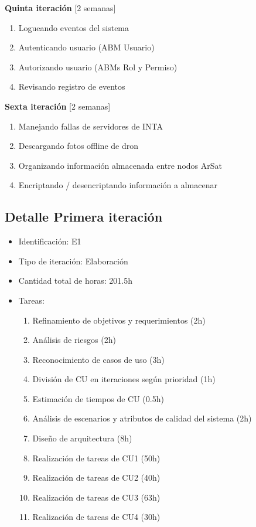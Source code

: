 \textbf{Quinta iteración} [2 semanas]
	\begin{enumerate} \itemsep -2pt
		\item Logueando eventos del sistema
		\item Autenticando usuario (ABM Usuario)
		\item Autorizando usuario (ABMs Rol y Permiso)
		\item Revisando registro de eventos
	\end{enumerate}

\textbf{Sexta iteración} [2 semanas]
	\begin{enumerate} \itemsep -2pt
		\item Manejando fallas de servidores de INTA
		\item Descargando fotos offline de dron
		\item Organizando información almacenada entre nodos ArSat
		\item Encriptando / desencriptando información a almacenar
	\end{enumerate}

\subsection{Detalle Primera iteración}

\begin{itemize}
\item Identificación: E1
\item Tipo de iteración: Elaboración
\item Cantidad total de horas: 201.5h
\item Tareas:
	\begin{enumerate}
	\item Refinamiento de objetivos y requerimientos (2h)
	\item Análisis de riesgos (2h)
	\item Reconocimiento de casos de uso (3h)
	\item División de CU en iteraciones según prioridad (1h)
	\item Estimación de tiempos de CU (0.5h)
	\item Análisis de escenarios y atributos de calidad del sistema (2h)
	\item Diseño de arquitectura (8h)
	\item Realización de tareas de CU1 (50h)
	\item Realización de tareas de CU2 (40h)
	\item Realización de tareas de CU3 (63h)
	\item Realización de tareas de CU4 (30h)
	\end{enumerate}
\end{itemize}

